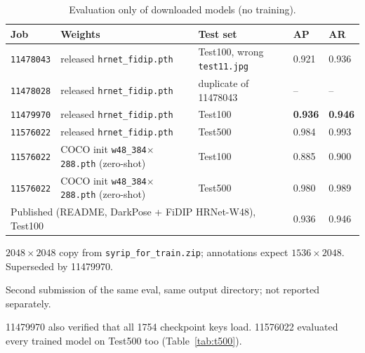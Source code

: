 \documentclass[10pt]{article}
\newcommand{\job}[1]{\texttt{#1}}
\newcommand{\na}{--}
\begin{document}
\begin{table}[h]\centering\small
\begin{threeparttable}
\caption{Evaluation only of downloaded models (no training).}
\begin{tabularx}{\linewidth}{l X l l l}
\toprule
Job & Weights & Test set & AP & AR \\
\midrule
\job{11478043} & released \texttt{hrnet\_fidip.pth} & Test100, wrong \texttt{test11.jpg}\tnote{a} & 0.921 & 0.936 \\
\job{11478028} & released \texttt{hrnet\_fidip.pth} & duplicate of 11478043\tnote{b} & \na & \na \\
\job{11479970} & released \texttt{hrnet\_fidip.pth} & Test100 & \textbf{0.936} & \textbf{0.946} \\
\job{11576022} & released \texttt{hrnet\_fidip.pth} & Test500 & 0.984 & 0.993 \\
\job{11576022} & COCO init \texttt{w48\_384$\times$288.pth} (zero-shot) & Test100 & 0.885 & 0.900 \\
\job{11576022} & COCO init \texttt{w48\_384$\times$288.pth} (zero-shot) & Test500 & 0.980 & 0.989 \\
\midrule
\multicolumn{3}{l}{Published (README, DarkPose + FiDIP HRNet-W48), Test100} & 0.936 & 0.946 \\
\bottomrule
\end{tabularx}
\begin{tablenotes}\footnotesize
\item[a] $2048\times2048$ copy from \texttt{syrip\_for\_train.zip}; annotations expect $1536\times2048$. Superseded by 11479970.
\item[b] Second submission of the same eval, same output directory; not reported separately.
\item 11479970 also verified that all 1754 checkpoint keys load. 11576022 evaluated every trained model on Test500 too (Table~\ref{tab:t500}).
\end{tablenotes}
\end{threeparttable}
\end{table}
\end{document}
